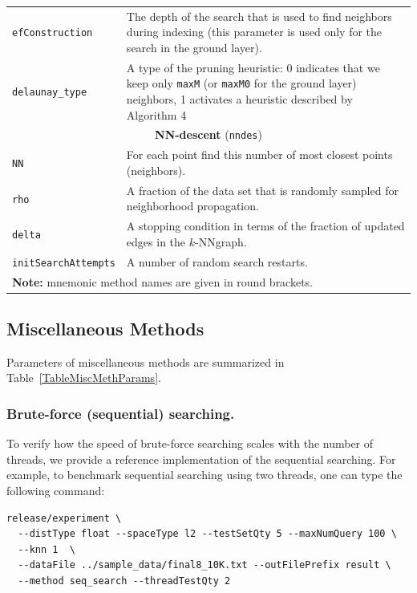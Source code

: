 \documentclass[runningheads,a4paper]{llncs}
\newcommand{\ttt}[1]{\texttt{#1}}
\newcommand{\knnns}{$k$-NN}
\begin{document}
\begin{table}
\begin{tabular}{l@{\hspace{2mm}}p{3.5in}}
\ttt{efConstruction}      & The depth of the search that is used to find neighbors during indexing (this parameter
                            is used only for the search in the ground layer). \\
\ttt{delaunay\_type}      & A type of the pruning heuristic: 0 indicates that we keep only \ttt{maxM} (or \ttt{maxM0} for the ground layer)
                            neighbors, 1 activates a heuristic described by Algorithm 4 \cite{malkov2014}  \\

\cmidrule(l){1-2} 
\multicolumn{2}{c}{\textbf{NN-descent} (\ttt{nndes}) \cite{dong2011efficient,malkov2012scalable,malkov2014}  }\\
\cmidrule(l){1-2} 
\ttt{NN}                  & For each point find this number of most closest points (neighbors). \\
\ttt{rho}                 & A fraction of the data set that is randomly sampled for neighborhood propagation.  \\
\ttt{delta}               & A stopping condition in terms of the fraction of updated edges in the \knnns graph. \\
\ttt{initSearchAttempts}  & A number of random search restarts. \\
\bottomrule
\multicolumn{2}{l}{\textbf{Note:} mnemonic method names are given in round brackets.}
\end{tabular}
\end{table}

\subsection{Miscellaneous Methods} \label{SectionMiscMeth}
Parameters of miscellaneous methods are summarized in Table~\ref{TableMiscMethParams}. 

\subsubsection{\textbf{Brute-force (sequential) searching}.}
To verify how the speed of brute-force searching
scales with the number of threads,
we provide a reference implementation of the sequential
searching.
For example, to benchmark sequential searching using two threads, 
one can type the following command:
{
\footnotesize
\begin{verbatim}
release/experiment \
  --distType float --spaceType l2 --testSetQty 5 --maxNumQuery 100 \
  --knn 1  \
  --dataFile ../sample_data/final8_10K.txt --outFilePrefix result \
  --method seq_search --threadTestQty 2
\end{verbatim}
}
\end{document}
